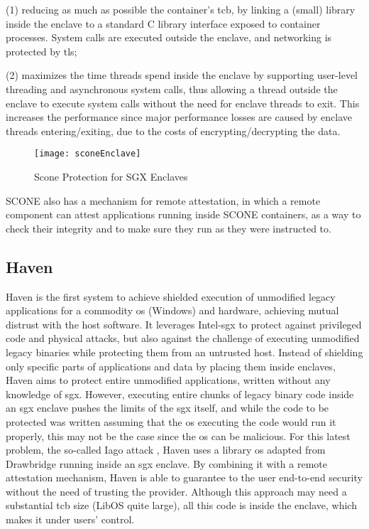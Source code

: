 (1) reducing as much as possible the container's \gls{tcb}, by linking a (small) library inside the enclave to a standard C library interface exposed to container processes. System calls are executed outside the enclave, and networking is protected by \gls{tls};

(2) maximizes the time threads spend inside the enclave by supporting user-level threading and asynchronous system calls, thus allowing a thread outside the enclave to execute system calls without the need for enclave threads to exit.
This increases the performance since major performance losses are caused by enclave threads entering/exiting, due to the costs of encrypting/decrypting the data.


\begin{figure}[htbp]
	\centering
	{\texttt{[image: sconeEnclave]}}
	\caption{Scone Protection for SGX Enclaves}
	\label{fig:sconeEnclave}
\end{figure}


SCONE also has a mechanism for remote attestation, in which a remote component can attest applications running inside SCONE containers, as a way to check their integrity and to make sure they run as they were instructed to.

\subsection{Haven}
\label{ssec:haven}

Haven is the first system to achieve shielded execution of unmodified legacy applications for a commodity \gls{os} (Windows) and hardware, achieving mutual distrust with the host software.
It leverages Intel-\gls{sgx} to protect against privileged code and physical attacks, but also against the challenge of executing unmodified legacy binaries while protecting them from an untrusted host.
Instead of shielding only specific parts of applications and data by placing them inside enclaves, Haven aims to protect entire unmodified applications, written without any knowledge of \gls{sgx}. 
However, executing entire chunks of legacy binary code inside an \gls{sgx} enclave pushes the limits of the \gls{sgx} itself, and while the code to be protected was written assuming that the \gls{os} executing the code would run it properly, this may not be the case since the \gls{os} can be malicious. For this latest problem, the so-called Iago attack \cite{iagoAttacks}, Haven uses a library \gls{os} adapted from Drawbridge \cite{drawbridge} running inside an \gls{sgx} enclave. 
By combining it with a remote attestation mechanism, Haven is able to guarantee to the user end-to-end security without the need of trusting the provider.
Although this approach may need a substantial \gls{tcb} size (LibOS quite large), all this code is inside the enclave, which makes it under users' control. 

